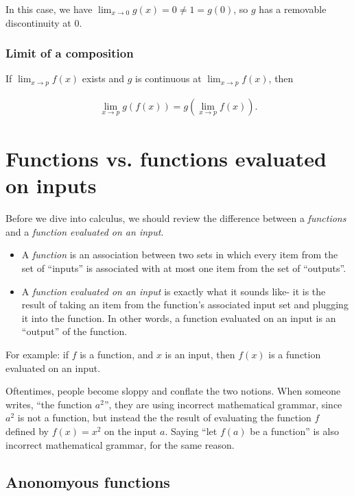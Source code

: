 \documentclass{article}
\begin{document}
In this case, we have $\lim_{x \rightarrow 0} g(x) = 0 \neq 1 = g(0)$, so $g$ has a removable discontinuity at $0$.

\subsubsection*{Limit of a composition}

If $\lim_{x \rightarrow p} f(x)$ exists and $g$ is continuous at $\lim_{x \rightarrow p} f(x)$, then

\begin{align*}
    {\lim_{x \rightarrow p} g(f(x)) = g(\lim_{x \rightarrow p}f(x))}.
\end{align*}

\newpage

\section*{Functions vs. functions evaluated on inputs}

Before we dive into calculus, we should review the difference between a \textit{functions} and a \textit{function evaluated on an input}.

\begin{itemize}
    \item A \textit{function} is an association between two sets in which every item from the set of ``inputs'' is associated with at most one item from the set of ``outputs''.
    \item A \textit{function evaluated on an input} is exactly what it sounds like- it is the result of taking an item from the function's associated input set and plugging it into the function. In other words, a function evaluated on an input is an ``output'' of the function.
\end{itemize}

For example: if $f$ is a function, and $x$ is an input, then $f(x)$ is a function evaluated on an input.

Oftentimes, people become sloppy and conflate the two notions. When someone writes, ``the function $a^2$'', they are using incorrect mathematical grammar, since $a^2$ is not a function, but instead the the result of evaluating the function $f$ defined by $f(x) = x^2$ on the input $a$. Saying ``let $f(a)$ be a function'' is also incorrect mathematical grammar, for the same reason.

\subsection*{Anonomyous functions}
\end{document}

